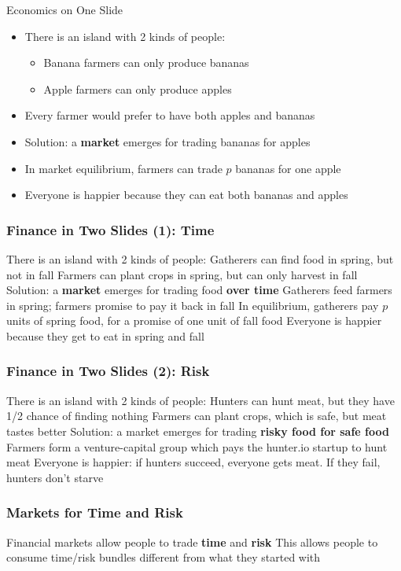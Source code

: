 \begin{frame}{Economics on One Slide}

\begin{itemize}
\item There is an island with 2 kinds of people:
\begin{itemize}
\item Banana farmers can only produce bananas
\item Apple farmers can only produce apples
\end{itemize}
\item Every farmer would prefer to have both apples and bananas \pause
\item Solution: a \textbf{market} emerges for trading bananas for apples \pause
\item In market equilibrium, farmers can trade $p$ bananas for one apple
\item Everyone is happier because they can eat both bananas and apples
\end{itemize}

\end{frame}

\begin{frame}
\frametitle{Finance in Two Slides (1): Time}
\bi
\m There is an island with 2 kinds of people:
\bi
\m Gatherers can find food in spring, but not in fall
\m Farmers can plant crops in spring, but can only harvest in fall
\ei
\pause
\m Solution: a \textbf{market} emerges for trading food \textbf{over time} \pause
\m Gatherers feed farmers in spring; farmers promise to pay it back in fall
\m In equilibrium, gatherers pay $p$ units of spring food, for a promise of one unit of fall food \pause
\m Everyone is happier because they get to eat in spring and fall
\ei
\end{frame}

\begin{frame}
\frametitle{Finance in Two Slides (2): Risk}
\bi
\m There is an island with 2 kinds of people:
\bi
\m Hunters can hunt meat, but they have 1/2 chance of finding nothing
\m Farmers can plant crops, which is safe, but meat tastes better
\ei \pause
\m Solution: a market emerges for trading \textbf{risky food for safe food} \pause
\m Farmers form a venture-capital group which pays the hunter.io startup to hunt meat \pause
\m Everyone is happier: if hunters succeed, everyone gets meat. If they fail, hunters don't starve
\ei
\end{frame}

\begin{frame}
\frametitle{Markets for Time and Risk}
\bi
\m Financial markets allow people to trade \textbf{time} and \textbf{risk}
\m This allows people to consume time/risk bundles different from what they started with
\ei
\end{frame}

